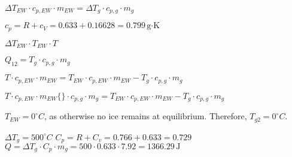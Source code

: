 \( \Delta T_{EW} \cdot c_{p,EW} \cdot m_{EW} = \Delta T_{g} \cdot c_{p,g} \cdot m_{g} \)  

\( c_p = R + c_V = 0.633 + 0.16628 = 0.799 \, \text{g·K} \)  

\( \Delta T_{EW} \cdot T_{EW} \cdot T \)  

\( Q_{12} = T_{g} \cdot c_{p,g} \cdot m_{g} \)  

\( T \cdot c_{p,EW} \cdot m_{EW} = T_{EW} \cdot c_{p,EW} \cdot m_{EW} - T_{g} \cdot c_{p,g} \cdot m_{g} \)  

\( T \cdot c_{p,EW} \cdot m_{EW} \{ \} \cdot c_{p,g} \cdot m_{g} = T_{EW} \cdot c_{p,EW} \cdot m_{EW} - T_{g} \cdot c_{p,g} \cdot m_{g} \)

\( T_{EW} = 0^\circ C \), as otherwise no ice remains at equilibrium. Therefore, \( T_{g2} = 0^\circ C \).  

\( \Delta T_g = 500^\circ C \)  
\( C_p = R + C_v = 0.766 + 0.633 = 0.729 \)  
\( Q = \Delta T_g \cdot C_p \cdot m_g = 500 \cdot 0.633 \cdot 7.92 = 1366.29 \, \text{J} \)